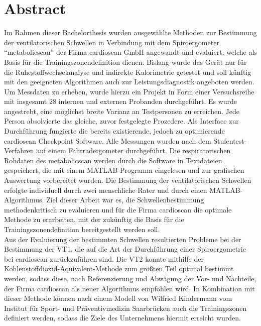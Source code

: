 \chapter*{Abstract}

Im Rahmen dieser Bachelorthesis wurden ausgewählte Methoden zur Bestimmung der ventilatorischen Schwellen in Verbindung mit dem Spiroergometer "`metabolicscan"' der Firma cardioscan GmbH angewandt und evaluiert, welche als Basis für die Trainingszonendefinition dienen. Bislang wurde das Gerät nur für die Ruhestoffwechselanalyse und indirekte Kalorimetrie getestet und soll künftig mit den geeigneten Algorithmen auch zur Leistungsdiagnostik angeboten werden. Um Messdaten zu erheben, wurde hierzu ein Projekt in Form einer Versuchsreihe mit insgesamt 28 internen und externen Probanden durchgeführt. Es wurde angestrebt, eine möglichst breite Varianz an Testpersonen zu erreichen. Jede Person absolvierte das gleiche, zuvor festgelegte Prozedere. Als Interface zur Durchführung fungierte die bereits existierende, jedoch zu optimierende cardioscan Checkpoint Software. Alle Messungen wurden nach dem Stufentest-Verfahren auf einem Fahrradergometer durchgeführt. Die respiratorischen Rohdaten des metabolicscan werden durch die Software in Textdateien gespeichert, die mit einem MATLAB-Programm eingelesen und zur grafischen Auswertung vorbereitet wurden. Die Bestimmung der ventilatorischen Schwellen erfolgte individuell durch zwei menschliche Rater und durch einen MATLAB-Algorithmus. Ziel dieser Arbeit war es, die Schwellenbestimmung methodenkritisch zu evaluieren und für die Firma cardioscan die optimale Methode zu erarbeiten, mit der zukünftig die Basis für die Trainingszonendefinition bereitgestellt werden soll.\\
Aus der Evaluierung der bestimmten Schwellen resultierten Probleme bei der Bestimmung der VT1, die auf die Art der Durchführung einer Spiroergometrie bei cardioscan zurückzuführen sind. Die VT2 konnte mithilfe der Kohlenstoffdioxid-Äquivalent-Methode zum größten Teil optimal bestimmt werden, sodass diese, nach Referenzierung und Abwägung der Vor- und Nachteile, der Firma cardioscan als neuer Algorithmus empfohlen wird. In Kombination mit dieser Methode können nach einem Modell von Wilfried Kindermann vom Institut für Sport- und Präventivmedizin Saarbrücken auch die Trainingszonen definiert werden, sodass die Ziele des Unternehmens hiermit erreicht wurden.
